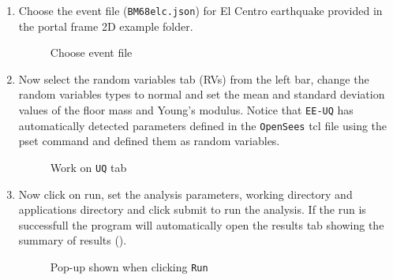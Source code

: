 \begin{enumerate}
\item Choose the event file (\texttt{BM68elc.json}) for El Centro earthquake provided in the portal frame 2D example folder.
\begin{figure}[!htbp]
  \caption{Choose event file}
  \label{fig:figure25}
\end{figure}

\item Now select the random variables tab (RVs) from the left bar, change the random variables types to normal and set the mean and standard deviation values of the floor mass and
Young’s modulus.  Notice that \texttt{EE-UQ} has automatically
detected parameters defined in the \texttt{OpenSees} tcl file using the pset
command and defined them as random variables.
\begin{figure}[!htbp]
  \caption{Work on \texttt{UQ} tab}
  \label{fig:figure26}
\end{figure}

\item Now click on run, set the analysis parameters, working directory and applications directory and click submit to run the analysis. 
If the run is successfull the program will automatically open the
results tab showing the summary of results ().
\begin{figure}[!htbp]
    \caption{Pop-up shown when clicking \texttt{Run}}
    \label{fig:figure27}
\end{figure}

\end{enumerate}

